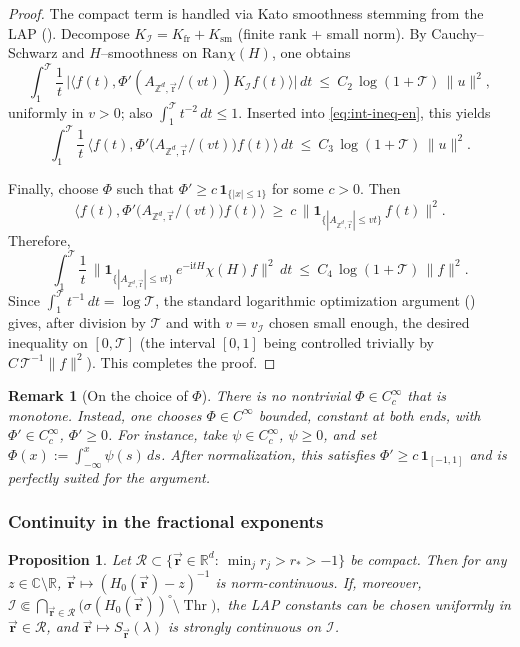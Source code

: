 \documentclass[10pt]{amsart} %
\newcommand{\1}{{\mathbb{I}}}
\newcommand{\Thr}{\operatorname{Thr}}
\numberwithin{equation}{section}
\newtheorem{proposition}[theorem]{Proposition}%
\newtheorem{remark}[theorem]{Remark}%
\begin{document}
\begin{proof}
The compact term is handled via Kato smoothness stemming from the LAP (\cite[Thm.~7.5.1]{ABG}).
Decompose $K_{\mathcal{I}}=K_{\mathrm{fr}}+K_{\mathrm{sm}}$ (finite rank + small norm).
By Cauchy–Schwarz and $H$–smoothness on $\mathrm{Ran}\chi(H)$, one obtains
\[
\int_1^{\mathcal{T}}\frac{1}{t}\,\big|\langle f(t),\Phi'(A_{\mathbb{Z}^d,\vec{\mathrm{r}}}/(vt))K_{\mathcal{I}} f(t)\rangle\big|\,dt
\ \le\ C_2\,\log(1+\mathcal{T})\,\|u\|^2,
\]
uniformly in $v>0$; also $\int_1^{\mathcal{T}}t^{-2}\,dt\le1$.
Inserted into \eqref{eq:int-ineq-en}, this yields
\[
\int_1^{\mathcal{T}}\frac{1}{t}\,\big\langle f(t),\Phi'\!\big(A_{\mathbb{Z}^d,\vec{\mathrm{r}}}/(vt)\big) f(t)\big\rangle\,dt
\ \le\ C_3\,\log(1+\mathcal{T})\,\|u\|^2.
\]

Finally, choose $\Phi$ such that $\Phi'\ge c\,\mathbf{1}_{\{|x|\le1\}}$ for some $c>0$. Then
\[
\big\langle f(t),\Phi'\!\big(A_{\mathbb{Z}^d,\vec{\mathrm{r}}}/(vt)\big) f(t)\big\rangle
\ \ge\ c\,\big\|\mathbf{1}_{\{|A_{\mathbb{Z}^d,\vec{\mathrm{r}}}|\le vt\}}\,f(t)\big\|^2.
\]
Therefore,
\[
\int_1^{\mathcal{T}}\frac{1}{t}\,\big\|\mathbf{1}_{\{|A_{\mathbb{Z}^d,\vec{\mathrm{r}}}|\le vt\}}\,e^{-\mathrm{i}tH}\chi(H)f\big\|^2\,dt
\ \le\ C_4\,\log(1+\mathcal{T})\,\|f\|^2.
\]
Since $\int_1^{\mathcal{T}}t^{-1}\,dt=\log\mathcal{T}$, the standard logarithmic optimization argument (\cite[§7.4]{ABG}) gives, after division by $\mathcal{T}$ and with $v=v_{\mathcal{I}}$ chosen small enough, the desired inequality on $[0,\mathcal{T}]$ (the interval $[0,1]$ being controlled trivially by $C\,\mathcal{T}^{-1}\|f\|^2$). This completes the proof.
\end{proof}

\begin{remark}[On the choice of $\Phi$]
There is no nontrivial $\Phi\in C_c^\infty$ that is monotone.
Instead, one chooses $\Phi\in C^\infty$ bounded, constant at both ends, with
$\Phi'\in C_c^\infty$, $\Phi'\ge0$.
For instance, take $\psi\in C_c^\infty$, $\psi\ge0$, and set
\(\Phi(x):=\int_{-\infty}^x\psi(s)\,ds\).
After normalization, this satisfies $\Phi'\ge c\,\mathbf{1}_{[-1,1]}$ and is perfectly suited for the argument.
\end{remark}


\subsubsection{Continuity in the fractional exponents}\label{subsubsec:continuity-r}
\begin{proposition}\label{prop:nr-cont}
Let  $\mathcal{R}\subset\{\vec{\mathbf{r}}\in\mathbb{R}^d:\ \min_j r_j>r_*>-1\}$ be compact.
Then for any $z\in\mathbb{C}\setminus\mathbb{R}$, $\vec{\mathbf{r}}\mapsto (H_0(\vec{\mathbf{r}})-z)^{-1}$ is norm-continuous.
If, moreover,
\(
\mathcal{I}\Subset \bigcap_{\vec{\mathbf{r}}\in\mathcal{R}}\big(\sigma(H_0(\vec{\mathbf{r}}))^\circ\setminus\Thr\big),
\)
the LAP constants can be chosen uniformly in $\vec{\mathbf{r}}\in\mathcal{R}$, and
$\vec{\mathbf{r}}\mapsto S_{\vec{\mathbf{r}}}(\lambda)$ is strongly continuous on $\mathcal{I}$.
\end{proposition}
\end{document}
